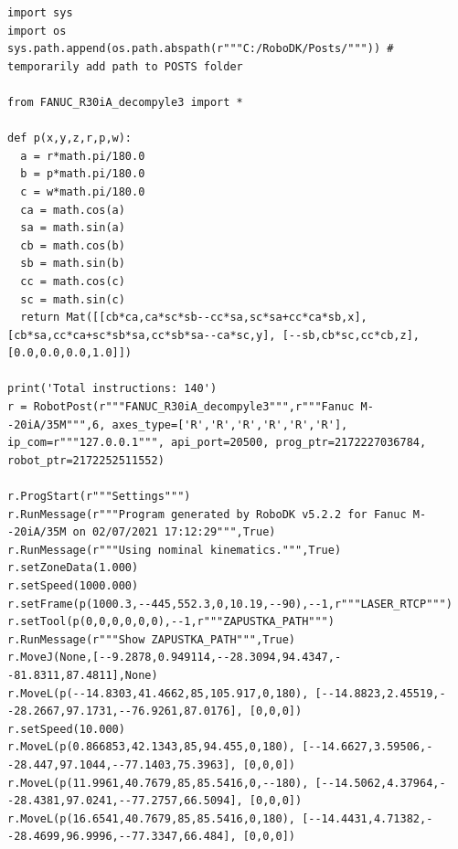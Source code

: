 \begin{code}
\begin{verbatim}
import sys
import os
sys.path.append(os.path.abspath(r"""C:/RoboDK/Posts/""")) # temporarily add path to POSTS folder

from FANUC_R30iA_decompyle3 import *

def p(x,y,z,r,p,w):
  a = r*math.pi/180.0
  b = p*math.pi/180.0
  c = w*math.pi/180.0
  ca = math.cos(a)
  sa = math.sin(a)
  cb = math.cos(b)
  sb = math.sin(b)
  cc = math.cos(c)
  sc = math.sin(c)
  return Mat([[cb*ca,ca*sc*sb--cc*sa,sc*sa+cc*ca*sb,x], [cb*sa,cc*ca+sc*sb*sa,cc*sb*sa--ca*sc,y], [--sb,cb*sc,cc*cb,z], [0.0,0.0,0.0,1.0]])

print('Total instructions: 140')
r = RobotPost(r"""FANUC_R30iA_decompyle3""",r"""Fanuc M--20iA/35M""",6, axes_type=['R','R','R','R','R','R'], ip_com=r"""127.0.0.1""", api_port=20500, prog_ptr=2172227036784, robot_ptr=2172252511552)

r.ProgStart(r"""Settings""")
r.RunMessage(r"""Program generated by RoboDK v5.2.2 for Fanuc M--20iA/35M on 02/07/2021 17:12:29""",True)
r.RunMessage(r"""Using nominal kinematics.""",True)
r.setZoneData(1.000)
r.setSpeed(1000.000)
r.setFrame(p(1000.3,--445,552.3,0,10.19,--90),--1,r"""LASER_RTCP""")
r.setTool(p(0,0,0,0,0,0),--1,r"""ZAPUSTKA_PATH""")
r.RunMessage(r"""Show ZAPUSTKA_PATH""",True)
r.MoveJ(None,[--9.2878,0.949114,--28.3094,94.4347,--81.8311,87.4811],None)
r.MoveL(p(--14.8303,41.4662,85,105.917,0,180), [--14.8823,2.45519,--28.2667,97.1731,--76.9261,87.0176], [0,0,0])
r.setSpeed(10.000)
r.MoveL(p(0.866853,42.1343,85,94.455,0,180), [--14.6627,3.59506,--28.447,97.1044,--77.1403,75.3963], [0,0,0])
r.MoveL(p(11.9961,40.7679,85,85.5416,0,--180), [--14.5062,4.37964,--28.4381,97.0241,--77.2757,66.5094], [0,0,0])
r.MoveL(p(16.6541,40.7679,85,85.5416,0,180), [--14.4431,4.71382,--28.4699,96.9996,--77.3347,66.484], [0,0,0])


\end{verbatim}
\end{code}

